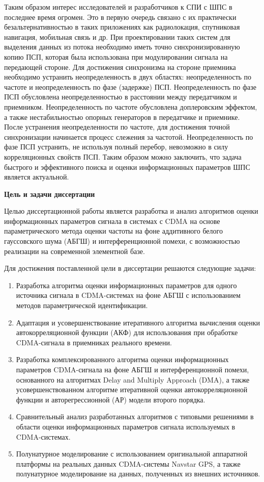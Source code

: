 Таким образом интерес исследователей и разработчиков к СПИ с ШПС в последнее время огромен. Это в первую очередь связано с их
практически безальтернативностью  в таких приложениях как радиолокация, спутниковая навигация, мобильная связь и др. При проектировании таких систем
для выделения данных из потока необходимо иметь точно синхронизированную копию ПСП, которая была использована
при модулировании сигнала на передающей стороне. Для достижения синхронизма на стороне приемника необходимо
устранить неопределенность в двух областях: неопределенность по частоте и неопределенность по фазе (задержке) ПСП.
Неопределенность по фазе ПСП обусловлена неопределенностью в расстоянии между передатчиком и приемником. Неопределенность
по частоте обусловлена доплеровским эффектом, а также нестабильностью опорных генераторов в
передатчике и приемнике. После устранения неопределенности по частоте, для достижения точной синхронизации
начинается процесс слежения за частотой. Неопределенность по фазе ПСП устранить, не используя полный перебор,
невозможно в силу корреляционных свойств ПСП. Таким образом можно заключить, что задача быстрого и эффективного
поиска и оценки информационных параметров ШПС является актуальной.

{\bf{Цель и задачи диссертации}}

Целью диссертационной работы является разработка и анализ алгоритмов оценки информационных параметров сигнала в системах с CDMA на основе
параметрического метода оценки частоты на фоне аддитивного белого гауссовского шума (АБГШ) и интерференционной помехи, с возможностью реализации на современной элементной базе.

Для достижения поставленной цели в диссертации решаются следующие задачи:
\begin{enumerate}
	\item {Разработка алгоритма оценки информационных параметров для одного источника сигнала в CDMA-системах на фоне АБГШ с использованием методов параметрической идентификации.}
	\item {Адаптация и усовершенствование итеративного алгоритма вычисления оценки автокорреляционной функции (АКФ) для использования при обработке CDMA-сигнала в приемниках реального времени.}
	\item {Разработка комплексированного алгоритма оценки информационных параметров CDMA-сигнала на фоне АБГШ и интерференционной помехи, основанного на алгоритмах Delay and Multiply Approach (DMA), а также усовершенствованном алгоритме итеративной оценки автокорреляционной функции и авторегрессионной (АР) модели второго порядка.}
	\item {Сравнительный анализ разработанных алгоритмов с типовыми решениями в области оценки информационных параметров сигнала используемых в CDMA-системах.}
	\item {Полунатурное моделирование с использованием оригинальной аппаратной платформы на реальных данных CDMA-системы Navstar GPS, а также полунатурное моделирование на данных, полученных из внешних источников.}
\end{enumerate}

